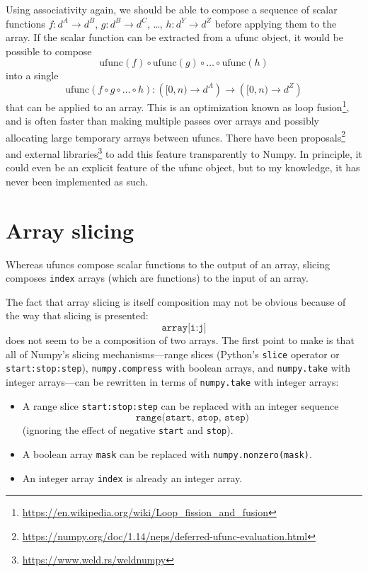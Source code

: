 \documentclass[12pt]{article}
\begin{document}
Using associativity again, we should be able to compose a sequence of scalar functions $f: d^A \to d^B$, $g: d^B \to d^C$, \ldots, $h: d^Y \to d^Z$ before applying them to the array. If the scalar function can be extracted from a ufunc object, it would be possible to compose
\[ \mbox{ufunc}(f) \circ \mbox{ufunc}(g) \circ \ldots \circ \mbox{ufunc}(h) \]
\noindent into a single
\[ \mbox{ufunc}(f \circ g \circ \ldots \circ h): \left([0, n) \to d^A\right) \to \left([0, n) \to d^Z\right) \]
\noindent that can be applied to an array. This is an optimization known as loop fusion\footnote{\url{https://en.wikipedia.org/wiki/Loop_fission_and_fusion}}, and is often faster than making multiple passes over arrays and possibly allocating large temporary arrays between ufuncs. There have been proposals\footnote{\url{https://numpy.org/doc/1.14/neps/deferred-ufunc-evaluation.html}} and external libraries\footnote{\url{https://www.weld.rs/weldnumpy}} to add this feature transparently to Numpy. In principle, it could even be an explicit feature of the ufunc object, but to my knowledge, it has never been implemented as such.

\section*{Array slicing}

Whereas ufuncs compose scalar functions to the output of an array, slicing composes \texttt{index} arrays (which are functions) to the input of an array.

The fact that array slicing is itself composition may not be obvious because of the way that slicing is presented:
\[ \texttt{array[i:j]} \]
\noindent does not seem to be a composition of two arrays. The first point to make is that all of Numpy's slicing mechanisms---range slices (Python's \texttt{slice} operator or \texttt{start:stop:step}), \texttt{numpy.compress} with boolean arrays, and \texttt{numpy.take} with integer arrays---can be rewritten in terms of \texttt{numpy.take} with integer arrays:
\begin{itemize}
\item A range slice \texttt{start:stop:step} can be replaced with an integer sequence
\[ \texttt{range(start, stop, step)} \]
(ignoring the effect of negative \texttt{start} and \texttt{stop}).
\item A boolean array \texttt{mask} can be replaced with \texttt{numpy.nonzero(mask)}.
\item An integer array \texttt{index} is already an integer array.
\end{itemize}
\end{document}
